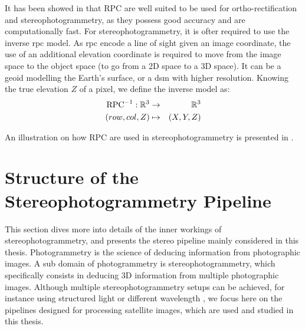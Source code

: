 It has been showed in \cite{baltsavias_metric_1992} that RPC are well suited to be used for ortho-rectification and stereophotogrammetry, as they possess good accuracy and are computationally fast. For stereophotogrammetry, it is ofter required to use the inverse \acrshort{rpc} model. As \acrshort{rpc} encode a line of sight given an image coordinate, the use of an additional elevation coordinate is required to move from the image space to the object space (\ie to go from a 2D space to a 3D space). It can be a geoid modelling the Earth's surface, or a \acrshort{dsm} with higher resolution. Knowing the true elevation $Z$ of a pixel, we define the inverse model as:
\begin{eqnarray}
    \mathrm{RPC}^{-1}:\mathbb{R}^3 &\rightarrow&\mathbb{R}^3\nonumber\\
    (row, col, Z) 	&\mapsto& (X,Y,Z) \label{eq:inverse_rpc}
\end{eqnarray}

An illustration on how RPC are used in stereophotogrammetry is presented in . 

\section{Structure of the Stereophotogrammetry Pipeline}\label{sec:classical_stero_pipeline}
This section dives more into details of the inner workings of stereophotogrammetry, and presents the stereo pipeline mainly considered in this thesis. Photogrammetry is the science of deducing information from photographic images. A sub domain of photogrammetry is stereophotogrammetry, which specifically consists in deducing 3D information from multiple photographic images. Although multiple stereophotogrammetry setups can be achieved, for instance using structured light \cite{scharstein_high-accuracy_2003} or different wavelength \cite{geng_rainbow_1996}, we focus here on the pipelines designed for processing satellite images, which are used and studied in this thesis. 

